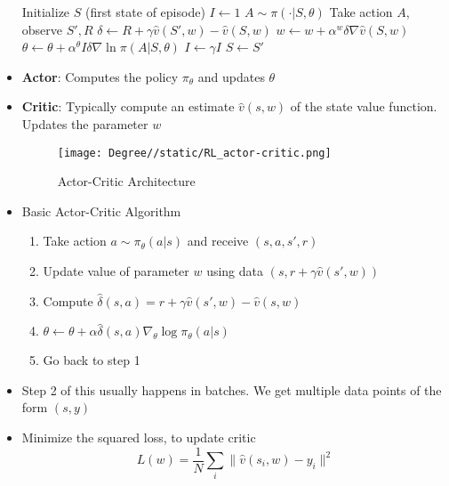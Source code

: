 \documentclass[a4paper]{article}
\begin{document}
\begin{itemize}
\begin{algorithm}[H]
\begin{algorithmic}[1]
            \Statex
                \State Initialize $S$ (first state of episode)
                \State $I\gets 1$
                    \State $A\sim \pi(\cdot|S,\theta)$
                    \State Take action $A$, observe $S',R$
                    \State $\delta \gets R+\gamma \hat{v}(S',w)-\hat{v}(S,w)$
                    \State $w\gets w+\alpha^w\delta \nabla \hat{v}(S,w)$
                    \State $\theta \gets \theta +\alpha^\theta I\delta \nabla \ln{\pi(A|S,\theta)}$
                    \State $I\gets \gamma I$
                    \State $S\gets S'$
                \EndWhile
            \EndFor
        \end{algorithmic}
    \end{algorithm}
    \item \textbf{Actor}: Computes the policy $\pi_\theta$ and updates $\theta$
    \item \textbf{Critic}: Typically compute an estimate $\hat{v}(s,w)$ of the state value function. Updates the parameter $w$
    \begin{figure}[H]
        \centering
        \texttt{[image: Degree//static/RL\_actor-critic.png]}
        \caption{Actor-Critic Architecture}
    \end{figure}
    \item Basic Actor-Critic Algorithm
    \begin{enumerate}
        \item Take action $a\sim \pi_\theta(a|s)$ and receive $(s,a,s',r)$
        \item Update value of parameter $w$ using data $(s,r+\gamma \hat{v}(s',w))$
        \item Compute $\hat{\delta}(s,a)=r+\gamma \hat{v}(s',w)-\hat{v}(s,w)$
        \item $\theta \gets \theta+\alpha \hat{\delta}(s,a) \nabla_\theta \log{\pi_\theta(a|s)}$
        \item Go back to step 1
    \end{enumerate}
    \item Step 2 of this usually happens in batches. We get multiple data points of the form $(s,y)$
    \item Minimize the squared loss, to update critic
    \begin{equation*}
        L(w)=\frac{1}{N}\sum_i\lVert \hat{v}(s_i,w)-y_i\rVert^2
    \end{equation*}

\end{itemize}
\end{document}
